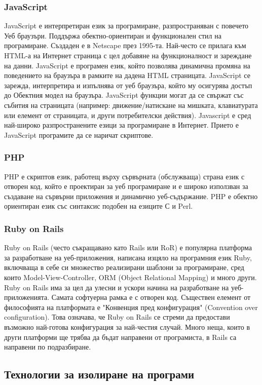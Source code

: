 \documentclass[pdftex,14pt,a4paper]{extreport}
\begin{document}
\subsubsection {JavaScript}
JavaScript е интерпретиран език за програмиране, разпространяван с повечето Уеб браузъри. Поддържа обектно-ориентиран и функционален стил на програмиране. Създаден е в Netscape през 1995-та. Най-често се прилага към HTML-а на Интернет страница с цел добавяне на функционалност и зареждане на данни. JavaScript е програмен език, който позволява динамична промяна на поведението на браузъра в рамките на дадена HTML страницата. JavaScript се зарежда, интерпретира и изпълнява от уеб браузъра, който му осигурява достъп до Обектния модел на браузъра. JavaScript функции могат да се свържат със събития на страницата (например: движение/натискане на мишката, клавиатурата или елемент от страницата, и други потребителски действия). Javascript е сред най-широко разпространените езици за програмиране в Интернет. Прието е JavaScript програмите да се наричат скриптове.
\subsubsection {PHP}
PHP е скриптов език, работещ върху сървърната (обслужваща) страна език с отворен код, който е проектиран за уеб програмиране и е широко използван за създаване на сървърни приложения и динамично уеб-съдържание. PHP е обектно ориентиран език със синтаксис подобен на езиците С и Perl.
\subsubsection {Ruby on Rails}
Ruby on Rails (често съкращавано като Rails или RoR) е популярна платформа за разработване на уеб-приложения, написана изцяло на програмния език Ruby, включваща в себе си множество реализирани шаблони за програмиране, сред които Model-View-Controller, ORM (Object Relational Mapping) и много други. Ruby on Rails има за цел да улесни и ускори начина на разработване на уеб-приложенията. Самата софтуерна рамка е с отворен код. Съществен елемент от философията на платформата е "Конвенция пред конфигурация" (Convention over configuration). Това означава, че Ruby on Rails се стреми да предостави възможно най-готова конфигурация за най-честия случай. Много неща, които в други платформи ще трябва да бъдат направени от програмиста, в Rails са направени по подразбиране.
\subsection {Технологии за изолиране на програми}
\end{document}
